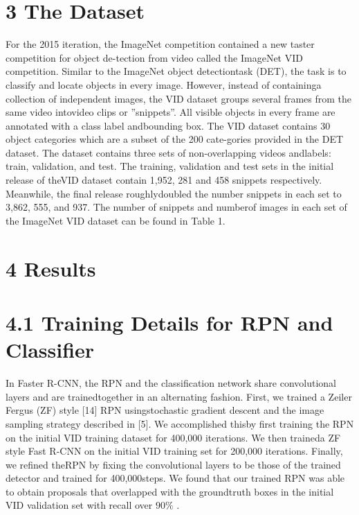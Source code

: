 \documentclass[
  10
]{article}
\begin{document}
\section{3 The Dataset}\label{the-dataset}

For the 2015 iteration, the ImageNet competition contained a new taster
competition for object de-tection from video called the ImageNet VID
competition. Similar to the ImageNet object detectiontask (DET), the
task is to classify and locate objects in every image. However, instead
of containinga collection of independent images, the VID dataset groups
several frames from the same video intovideo clips or ''snippets''. All
visible objects in every frame are annotated with a class label
andbounding box. The VID dataset contains 30 object categories which are
a subset of the 200 cate-gories provided in the DET dataset. The dataset
contains three sets of non-overlapping videos andlabels: train,
validation, and test. The training, validation and test sets in the
initial release of theVID dataset contain 1,952, 281 and 458 snippets
respectively. Meanwhile, the final release roughlydoubled the number
snippets in each set to 3,862, 555, and 937. The number of snippets and
numberof images in each set of the ImageNet VID dataset can be found in
Table 1.

\section{4 Results}\label{results}

\section{4.1 Training Details for RPN and
Classifier}\label{training-details-for-rpn-and-classifier}

In Faster R-CNN, the RPN and the classification network share
convolutional layers and are trainedtogether in an alternating fashion.
First, we trained a Zeiler Fergus (ZF) style {[}14{]} RPN
usingstochastic gradient descent and the image sampling strategy
described in {[}5{]}. We accomplished thisby first training the RPN on
the initial VID training dataset for 400,000 iterations. We then
traineda ZF style Fast R-CNN on the initial VID training set for 200,000
iterations. Finally, we refined theRPN by fixing the convolutional
layers to be those of the trained detector and trained for 400,000steps.
We found that our trained RPN was able to obtain proposals that
overlapped with the groundtruth boxes in the initial VID validation set
with recall over \(90 \%\) .
\end{document}
